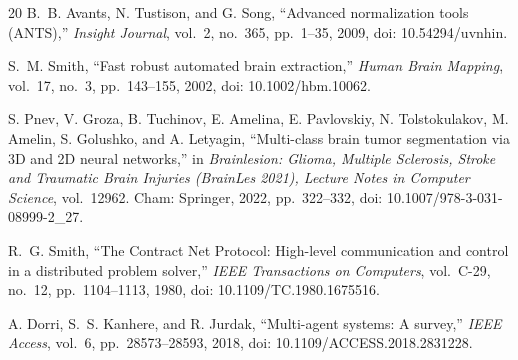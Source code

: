 \documentclass[conference]{IEEEtran}
\begin{document}
\begin{thebibliography}{20}
 B.~B. Avants, N. Tustison, and G. Song, ``Advanced normalization tools (ANTS),'' \textit{Insight Journal}, vol.~2, no.~365, pp.~1--35, 2009, doi: 10.54294/uvnhin.

 S.~M. Smith, ``Fast robust automated brain extraction,'' \textit{Human Brain Mapping}, vol.~17, no.~3, pp.~143--155, 2002, doi: 10.1002/hbm.10062.

 S. Pnev, V. Groza, B. Tuchinov, E. Amelina, E. Pavlovskiy, N. Tolstokulakov, M. Amelin, S. Golushko, and A. Letyagin, ``Multi-class brain tumor segmentation via 3D and 2D neural networks,'' in \textit{Brainlesion: Glioma, Multiple Sclerosis, Stroke and Traumatic Brain Injuries (BrainLes 2021), Lecture Notes in Computer Science}, vol.~12962. Cham: Springer, 2022, pp.~322--332, doi: 10.1007/978-3-031-08999-2\_27.

 R.~G. Smith, ``The Contract Net Protocol: High-level communication and control in a distributed problem solver,'' \textit{IEEE Transactions on Computers}, vol.~C-29, no.~12, pp.~1104--1113, 1980, doi: 10.1109/TC.1980.1675516.

 A. Dorri, S.~S. Kanhere, and R. Jurdak, ``Multi-agent systems: A survey,'' \textit{IEEE Access}, vol.~6, pp.~28573--28593, 2018, doi: 10.1109/ACCESS.2018.2831228.
\end{thebibliography}
\end{document}
